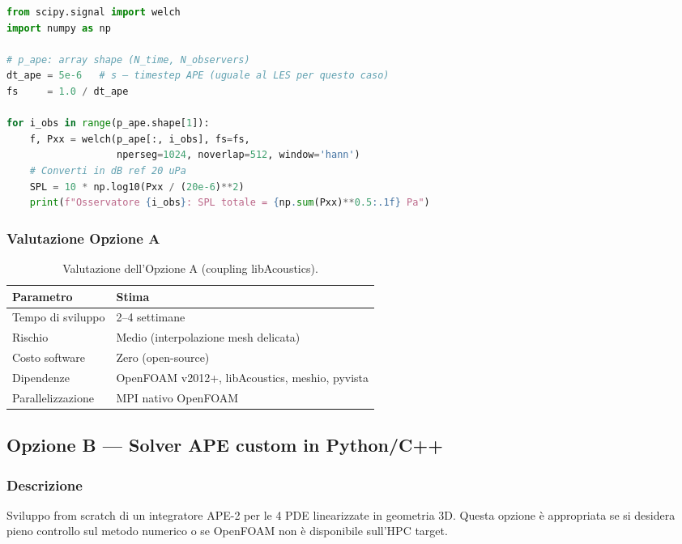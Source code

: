 \documentclass[11pt,a4paper]{article}
\begin{document}
\begin{lstlisting}[language=Python, style=SU2cfg,
  caption={Calcolo della PSD dal campo APE con metodo di Welch.},
  label=lst:psd_welch]
from scipy.signal import welch
import numpy as np

# p_ape: array shape (N_time, N_observers)
dt_ape = 5e-6   # s — timestep APE (uguale al LES per questo caso)
fs     = 1.0 / dt_ape

for i_obs in range(p_ape.shape[1]):
    f, Pxx = welch(p_ape[:, i_obs], fs=fs,
                   nperseg=1024, noverlap=512, window='hann')
    # Converti in dB ref 20 uPa
    SPL = 10 * np.log10(Pxx / (20e-6)**2)
    print(f"Osservatore {i_obs}: SPL totale = {np.sum(Pxx)**0.5:.1f} Pa")
\end{lstlisting}

\subsubsection{Valutazione Opzione A}

\begin{table}[H]
  \centering
  \caption{Valutazione dell'Opzione A (coupling libAcoustics).}
  \begin{tabular}{ll}
    \toprule
    \textbf{Parametro} & \textbf{Stima} \\
    \midrule
    Tempo di sviluppo & 2–4 settimane \\
    Rischio & Medio (interpolazione mesh delicata) \\
    Costo software & Zero (open-source) \\
    Dipendenze & OpenFOAM v2012+, libAcoustics, meshio, pyvista \\
    Parallelizzazione & MPI nativo OpenFOAM \\
    \bottomrule
  \end{tabular}
\end{table}

\subsection{Opzione B — Solver APE custom in Python/C++}

\subsubsection{Descrizione}

Sviluppo from scratch di un integratore APE-2 per le 4 PDE linearizzate
in geometria 3D. Questa opzione è appropriata se si desidera pieno controllo
sul metodo numerico o se OpenFOAM non è disponibile sull'HPC target.
\end{document}

